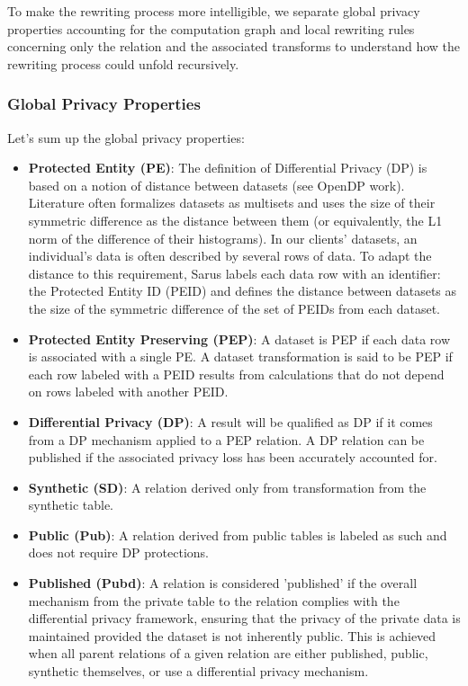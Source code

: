 \documentclass[letterpaper]{article} %
\begin{document}
To make the rewriting process more intelligible, we separate global privacy properties accounting for the computation graph and local rewriting rules concerning only the relation and the associated transforms to understand how the rewriting process could unfold recursively.

\subsubsection{Global Privacy Properties}
Let's sum up the global privacy properties:
\begin{itemize}
    \item \textbf{Protected Entity (PE)}: The definition of Differential Privacy (DP) is based on a notion of distance between datasets (see OpenDP work). Literature often formalizes datasets as multisets and uses the size of their symmetric difference as the distance between them (or equivalently, the L1 norm of the difference of their histograms). In our clients' datasets, an individual's data is often described by several rows of data. To adapt the distance to this requirement, Sarus labels each data row with an identifier: the Protected Entity ID (PEID) and defines the distance between datasets as the size of the symmetric difference of the set of PEIDs from each dataset.
    \item \textbf{Protected Entity Preserving (PEP)}: A dataset is PEP if each data row is associated with a single PE. A dataset transformation is said to be PEP if each row labeled with a PEID results from calculations that do not depend on rows labeled with another PEID.
    \item \textbf{Differential Privacy (DP)}: A result will be qualified as DP if it comes from a DP mechanism applied to a PEP relation. A DP relation can be published if the associated privacy loss has been accurately accounted for.
    \item \textbf{Synthetic (SD)}: A relation derived only from transformation from the synthetic table.
    \item \textbf{Public (Pub)}: A relation derived from public tables is labeled as such and does not require DP protections.
    \item \textbf{Published (Pubd)}: A relation is considered 'published' if the overall mechanism from the private table to the relation complies with the differential privacy framework, ensuring that the privacy of the private data is maintained provided the dataset is not inherently public. This is achieved when all parent relations of a given relation are either published, public, synthetic themselves, or use a differential privacy mechanism.
\end{itemize}
\end{document}
